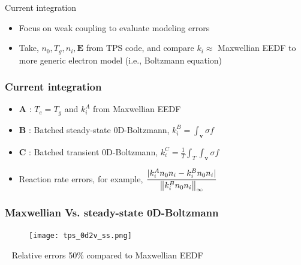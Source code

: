 \documentclass[mathserif, aspectratio=169]{beamer}
\newcommand{\vect}[1]{\boldsymbol{#1}}
\newcommand{\norm}[1]{\left\lVert#1\right\rVert}
\begin{document}
\begin{frame}
\begin{columns}
\begin{column}{0.48\textwidth}
\begin{figure}
{}
			\end{figure}
		\end{column}
	\end{columns}
	Current integration
	\begin{itemize}
		\item Focus on weak coupling to evaluate modeling errors
		\item Take, $n_0, T_g, n_i, \vect{E}$ from TPS code, and compare $k_i\approx$ Maxwellian EEDF to more generic electron model (i.e., Boltzmann equation) 
	\end{itemize}
\end{frame}

\begin{frame}
	\frametitle{Current integration}
	\begin{itemize}
		\item \textbf{A} : $T_e=T_g$ and $k_i^{A}$ from Maxwellian EEDF %
		\item \textbf{B} : Batched steady-state 0D-Boltzmann, $k_i^{B} = \int_{\vect{v}} \sigma f $ 
		\item \textbf{C} : Batched transient 0D-Boltzmann, $k_i^{C} = \frac{1}{T} \int_{T} \int_{\vect{v}} \sigma f $ %
		\vspace{0.25in}
		\item Reaction rate errors, for example, $\cfrac{|k_i^{A} n_0 n_i  - k_i^{B} n_0 n_i|}{\norm{k_i^{B} n_0 n_i}_{\infty}}$ %
	\end{itemize}
\end{frame}

\begin{frame}
	\frametitle{Maxwellian Vs. steady-state 0D-Boltzmann}
	\begin{figure}
		\begin{center}
			\texttt{[image: tps\_0d2v\_ss.png]}
		\end{center}
	\end{figure}
	\textbullet~ Relative errors 50\% compared to Maxwellian EEDF
\end{frame}
\end{document}
